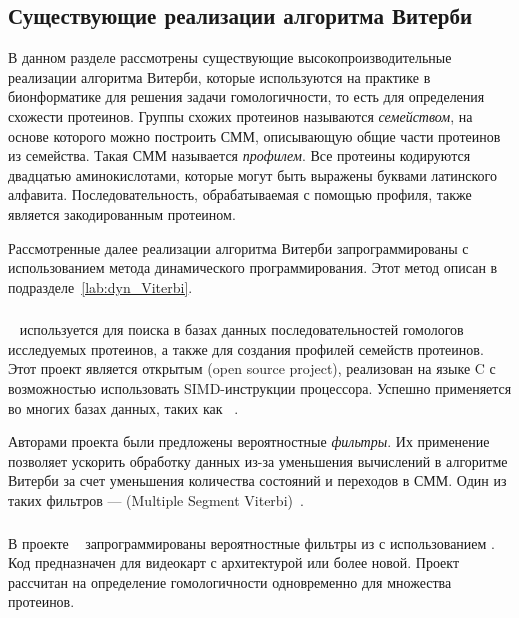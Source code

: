 \subsection{Существующие реализации алгоритма Витерби}
\label{lab:exist_Viterbi}
В данном разделе рассмотрены существующие 
высокопроизводительные реализации алгоритма Витерби, которые 
используются на практике в бионформатике для решения задачи 
гомологичности, то есть для определения схожести протеинов.
Группы схожих протеинов называются \emph{семейством},
на основе которого можно построить СММ, описывающую общие 
части протеинов из семейства.
Такая СММ называется \emph{профилем}.
Все протеины кодируются двадцатью аминокислотами, 
которые могут быть выражены буквами латинского алфавита.
Последовательность, обрабатываемая с помощью профиля, также 
является закодированным протеином.

Рассмотренные далее реализации алгоритма Витерби 
запрограммированы с использованием метода динамического 
программирования.
Этот метод описан в подразделе~\ref{lab:dyn_Viterbi}.

\subsubsection{}
\label{lab:HMMer}
~\cite{HMMer} используется для поиска в базах 
данных последовательностей гомологов исследуемых протеинов, а 
также для создания профилей семейств протеинов.
Этот проект является открытым (open source project), реализован  на языке C с возможностью
использовать SIMD-инструкции процессора.
Успешно применяется во многих базах данных, таких как ~\cite{Pfam}.

Авторами проекта были предложены вероятностные \emph{фильтры}.
Их применение позволяет ускорить обработку данных из-за 
уменьшения вычислений в алгоритме Витерби за счет уменьшения 
количества состояний и переходов в СММ.
Один из таких фильтров ---  (Multiple Segment 
Viterbi)~\cite{MSV_Eddy}.

\subsubsection{}
\label{lab:CUDAMPF}
В проекте ~\cite{cudampf} запрограммированы 
вероятностные фильтры из  с использованием 
.
Код предназначен для видеокарт  с 
архитектурой  или более новой.
Проект рассчитан на определение гомологичности одновременно 
для множества протеинов.

